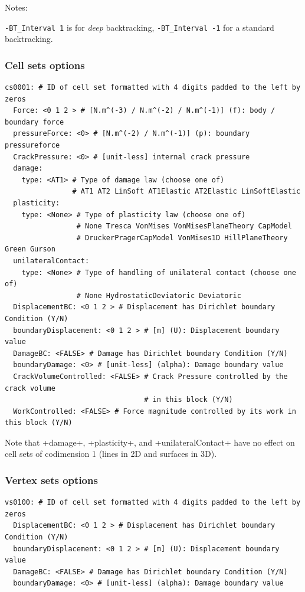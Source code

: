 \documentclass[10pt,oneside]{report}
\begin{document}
Notes:
\begin{compactenum}
\item \verb+-BT_Interval 1+ is for \emph{deep} backtracking, \verb+-BT_Interval -1+ for a standard backtracking.
\end{compactenum}

\subsubsection{Cell sets options}
\begin{verbatim}
cs0001: # ID of cell set formatted with 4 digits padded to the left by zeros
  Force: <0 1 2 > # [N.m^(-3) / N.m^(-2) / N.m^(-1)] (f): body / boundary force 
  pressureForce: <0> # [N.m^(-2) / N.m^(-1)] (p): boundary pressureforce 
  CrackPressure: <0> # [unit-less] internal crack pressure 
  damage:
    type: <AT1> # Type of damage law (choose one of)  
                # AT1 AT2 LinSoft AT1Elastic AT2Elastic LinSoftElastic
  plasticity:
    type: <None> # Type of plasticity law (choose one of)  
                 # None Tresca VonMises VonMisesPlaneTheory CapModel 
                 # DruckerPragerCapModel VonMises1D HillPlaneTheory Green Gurson
  unilateralContact:
    type: <None> # Type of handling of unilateral contact (choose one of)  
                 # None HydrostaticDeviatoric Deviatoric
  DisplacementBC: <0 1 2 > # Displacement has Dirichlet boundary Condition (Y/N)
  boundaryDisplacement: <0 1 2 > # [m] (U): Displacement boundary value 
  DamageBC: <FALSE> # Damage has Dirichlet boundary Condition (Y/N) 
  boundaryDamage: <0> # [unit-less] (alpha): Damage boundary value 
  CrackVolumeControlled: <FALSE> # Crack Pressure controlled by the crack volume 
                                 # in this block (Y/N) 
  WorkControlled: <FALSE> # Force magnitude controlled by its work in this block (Y/N) 
\end{verbatim}

Note that +damage+, +plasticity+, and +unilateralContact+ have no effect on cell sets of codimension 1 (lines in 2D and surfaces in 3D).

\subsubsection{Vertex sets options}
\begin{verbatim}
vs0100: # ID of cell set formatted with 4 digits padded to the left by zeros
  DisplacementBC: <0 1 2 > # Displacement has Dirichlet boundary Condition (Y/N)
  boundaryDisplacement: <0 1 2 > # [m] (U): Displacement boundary value 
  DamageBC: <FALSE> # Damage has Dirichlet boundary Condition (Y/N) 
  boundaryDamage: <0> # [unit-less] (alpha): Damage boundary value 
\end{verbatim}
\end{document}
